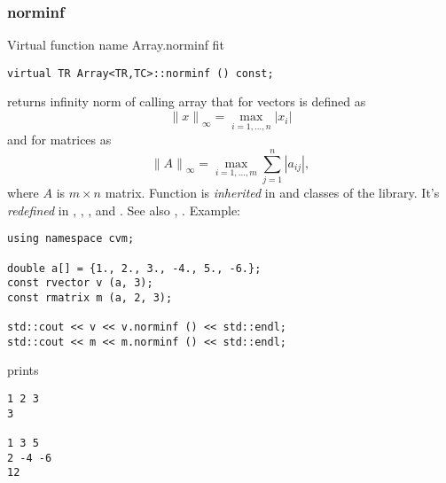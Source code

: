 \subsubsection{norminf}
Virtual function%
\pdfdest name {Array.norminf} fit
\begin{verbatim}
virtual TR Array<TR,TC>::norminf () const;
\end{verbatim}
returns  infinity norm of calling array that for vectors
is defined as
\begin{equation*}
{\|x\|}_\infty=\max_{i=1,\dots,n} |x_i|
\end{equation*}
and for matrices as
\begin{equation*}
{\|A\|}_\infty=\max_{i=1,\dots,m} \sum_{j=1}^{n} |a_{ij}|,
\end{equation*}
where $A$ is $m\times n$ matrix.
Function is \emph{inherited}
in
 and   
classes of the library.
It's \emph{redefined} in ,
, ,
 and .
See also , .
Example:
\begin{Verbatim}
using namespace cvm;

double a[] = {1., 2., 3., -4., 5., -6.};
const rvector v (a, 3);
const rmatrix m (a, 2, 3);

std::cout << v << v.norminf () << std::endl;
std::cout << m << m.norminf () << std::endl;
\end{Verbatim}
prints
\begin{Verbatim}
1 2 3
3

1 3 5
2 -4 -6
12
\end{Verbatim}
\newpage



